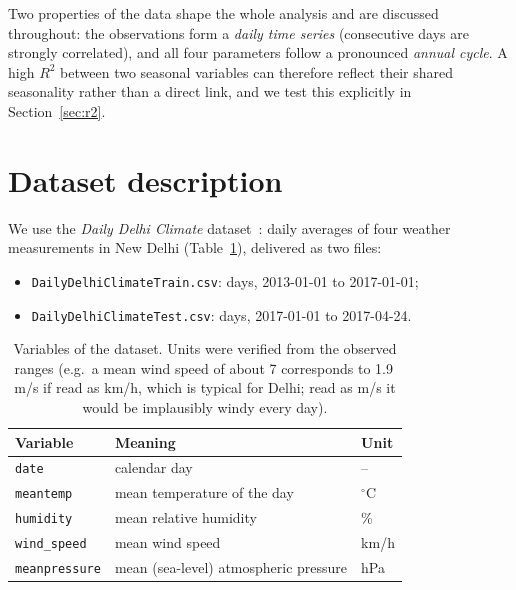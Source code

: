 \documentclass[11pt,a4paper]{article}
\newcommand{\var}[1]{\texttt{#1}}
\newcommand{\Rsq}{R^2}
\begin{document}
Two properties of the data shape the whole analysis and are discussed
throughout: the observations form a \emph{daily time series} (consecutive days
are strongly correlated), and all four parameters follow a pronounced
\emph{annual cycle}. A high $\Rsq$ between two seasonal variables can therefore
reflect their shared seasonality rather than a direct link, and we test this
explicitly in Section~\ref{sec:r2}.

\section{Dataset description}

We use the \emph{Daily Delhi Climate} dataset~\cite{kaggle}: daily averages of four
weather measurements in New Delhi (Table~\ref{tab:vars}), delivered as two files:
\begin{itemize}
  \item \texttt{DailyDelhiClimateTrain.csv}: \nTrainFile{} days, 2013-01-01 to 2017-01-01;
  \item \texttt{DailyDelhiClimateTest.csv}: \nTestFile{} days, 2017-01-01 to 2017-04-24.
\end{itemize}

\begin{table}[htbp]
  \centering
  \caption{Variables of the dataset. Units were verified from the observed ranges
           (e.g.\ a mean wind speed of about 7 corresponds to 1.9\,m/s if read as km/h,
           which is typical for Delhi; read as m/s it would be implausibly windy every day).}
  \label{tab:vars}
  \begin{tabular}{lll}
    \toprule
    Variable & Meaning & Unit \\
    \midrule
    \var{date}         & calendar day                        & -- \\
    \var{meantemp}     & mean temperature of the day         & $^\circ$C \\
    \var{humidity}     & mean relative humidity              & \% \\
    \var{wind\_speed}  & mean wind speed                     & km/h \\
    \var{meanpressure} & mean (sea-level) atmospheric pressure & hPa \\
    \bottomrule
  \end{tabular}
\end{table}
\end{document}
